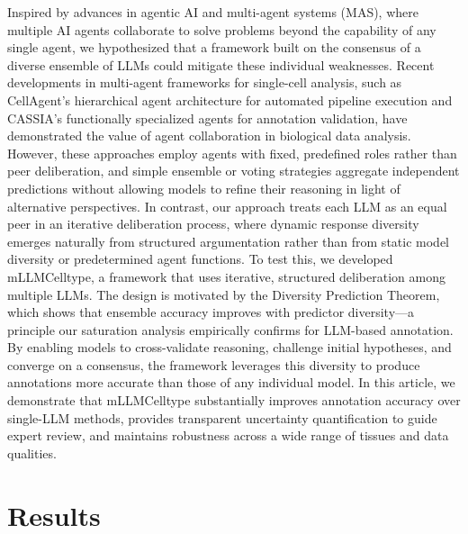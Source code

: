 \documentclass[pdflatex,sn-nature]{sn-jnl}%
\theoremstyle{thmstyleone}%
\theoremstyle{thmstyletwo}%
\theoremstyle{thmstylethree}%
\begin{document}
Inspired by advances in agentic AI and multi-agent systems (MAS), where multiple AI agents collaborate to solve problems beyond the capability of any single agent\cite{duImprovingFactualityReasoning2023}, we hypothesized that a framework built on the consensus of a diverse ensemble of LLMs could mitigate these individual weaknesses. Recent developments in multi-agent frameworks for single-cell analysis, such as CellAgent's hierarchical agent architecture for automated pipeline execution\cite{xiao2024cellagent} and CASSIA's functionally specialized agents for annotation validation\cite{xie2024cassia}, have demonstrated the value of agent collaboration in biological data analysis. However, these approaches employ agents with fixed, predefined roles rather than peer deliberation, and simple ensemble or voting strategies aggregate independent predictions without allowing models to refine their reasoning in light of alternative perspectives. In contrast, our approach treats each LLM as an equal peer in an iterative deliberation process, where dynamic response diversity emerges naturally from structured argumentation rather than from static model diversity or predetermined agent functions. To test this, we developed mLLMCelltype, a framework that uses iterative, structured deliberation among multiple LLMs. The design is motivated by the Diversity Prediction Theorem\cite{Page2007TheDifference}, which shows that ensemble accuracy improves with predictor diversity---a principle our saturation analysis empirically confirms for LLM-based annotation. By enabling models to cross-validate reasoning, challenge initial hypotheses, and converge on a consensus, the framework leverages this diversity to produce annotations more accurate than those of any individual model. In this article, we demonstrate that mLLMCelltype substantially improves annotation accuracy over single-LLM methods, provides transparent uncertainty quantification to guide expert review, and maintains robustness across a wide range of tissues and data qualities.

\section{Results}
\end{document}

